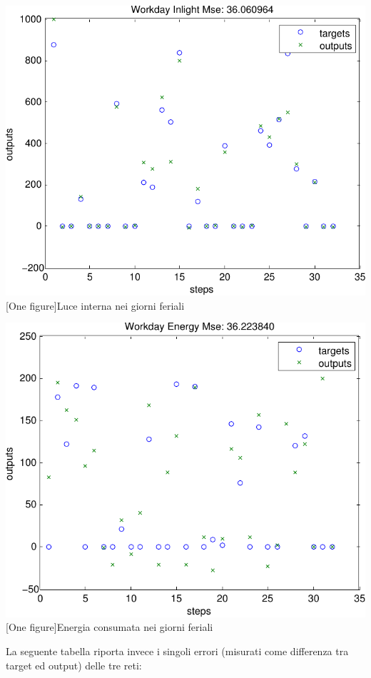 \includegraphics[scale=0.5]{images/anfis/workday/inlight.pdf}
[One figure]{Luce interna nei giorni feriali}
\vspace{20px}

\includegraphics[scale=0.5]{images/anfis/workday/energy.pdf}
[One figure]{Energia consumata nei giorni feriali}
\vspace{20px}

La seguente tabella riporta invece i singoli errori (misurati come differenza tra target ed output) delle tre reti:

